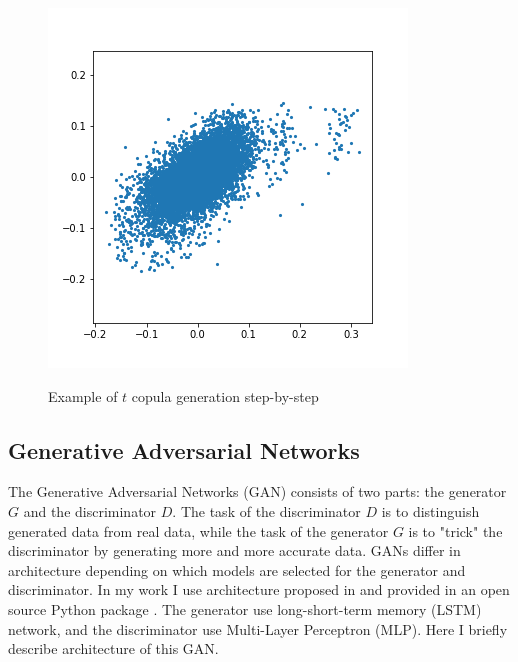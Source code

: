 \documentclass{article}
\begin{document}
\begin{figure}[!ht]
\begin{minipage}{.33\linewidth}
        \label{fig:copula2}
    \end{minipage}
    \begin{minipage}{.33\linewidth}
        \centering
        \includegraphics[width=\textwidth]{pics/copula3.png}
        \label{fig:copula3}
    \end{minipage}
    \caption{Example of $t$ copula generation step-by-step}
    \label{fig:mem}
\end{figure}

\subsection{Generative Adversarial Networks}
\label{section:gan}
The Generative Adversarial Networks (GAN) consists of two parts: the generator $G$ and the discriminator $D$. The task of the discriminator $D$ is to distinguish generated data from real data, while the task of the generator $G$ is to "trick" the discriminator by generating more and more accurate data. GANs differ in architecture depending on which models are selected for the generator and discriminator. In my work I use architecture proposed in \cite{xu2018synthesizing} and provided in an open source Python package \cite{tgan}. The generator use long-short-term memory (LSTM) network, and the discriminator use Multi-Layer Perceptron (MLP). Here I briefly describe architecture of this GAN.
\end{document}
